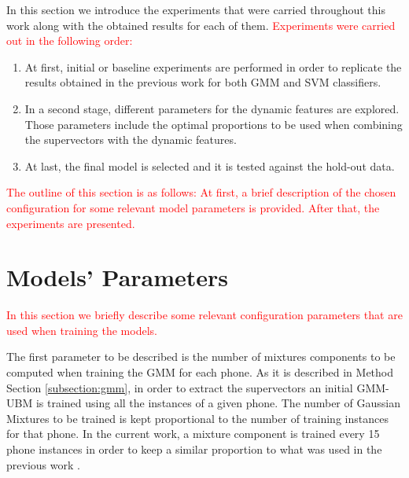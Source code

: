
In this section we introduce the experiments that were carried throughout this work
along with the obtained results for each of them. \textcolor{red}{Experiments were carried
out in the following order:}

\begin{enumerate}
	\item At first, initial or baseline
	experiments are performed in order to replicate the results
	obtained in the previous work \cite{main} for both GMM and SVM classifiers.
	\item In a second stage, different parameters for the dynamic features are explored.
	Those parameters include the optimal proportions to be used when combining the
	supervectors with the dynamic features.
	\item At last, the final model is selected and it is tested against the hold-out data.
\end{enumerate}


\textcolor{red}{The outline of this section is as follows: At first, a brief description of the
chosen configuration
for some relevant model parameters is provided.
After that, the experiments are presented.}

\section{Models' Parameters}

\textcolor{red}{In this section we briefly describe some relevant configuration parameters that
are used when training the models.}

The first parameter to be described is the number of mixtures components
to be computed when training the GMM for each phone. As it is described in Method Section
\ref{subsection:gmm}, in order to extract the supervectors an initial GMM-UBM is trained
using all the instances of a given phone.
The number of Gaussian Mixtures to be trained is kept proportional to the number of
training instances for that phone. In the current work, a
mixture component is trained every 15 phone instances
in order to keep a similar proportion to what was used in the previous work \cite{main} .

